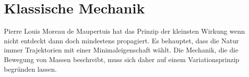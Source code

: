 %
%
%
\chapter{Klassische Mechanik
\label{buch:chapter:mechanik}}
Pierre Louis Moreau de Maupertuis hat das Prinzip der kleinsten
Wirkung wenn nicht entdeckt dann doch mindestens propagiert.
Es behauptet, dass die Natur immer Trajektorien mit einer
Minimaleigenschaft wählt.
Die Mechanik, die die Bewegung von Massen beschreibt, muss sich
daher auf einem Variationsprinzip begründen lassen.





